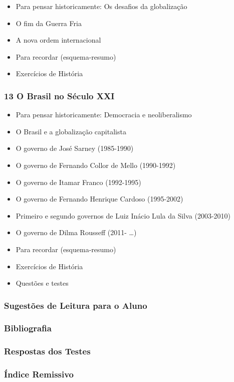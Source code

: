 \documentclass[a4paper,12pt]{article}[abntex2]
\begin{document}
\begin{itemize}
\item Para pensar historicamente: Os desafios da globalização
\item O fim da Guerra Fria
\item A nova ordem internacional
\item Para recordar (esquema-resumo)
\item Exercícios de História
\end{itemize}
\subsubsection*{13 O Brasil no Século XXI}

\begin{itemize}
\item Para pensar historicamente: Democracia e neoliberalismo
\item O Brasil e a globalização capitalista
\item O governo de José Sarney (1985-1990)
\item O governo de Fernando Collor de Mello (1990-1992)
\item O governo de Itamar Franco (1992-1995)
\item O governo de Fernando Henrique Cardoso (1995-2002)
\item Primeiro e segundo governos de Luiz Inácio Lula da Silva (2003-2010)
\item O governo de Dilma Rousseff (2011- …)
\item Para recordar (esquema-resumo)
\item Exercícios de História
\item Questões e testes
\end{itemize}
\subsubsection*{Sugestões de Leitura para o Aluno}

\subsubsection*{Bibliografia}

\subsubsection*{Respostas dos Testes}

\subsubsection*{Índice Remissivo}
\end{document}
